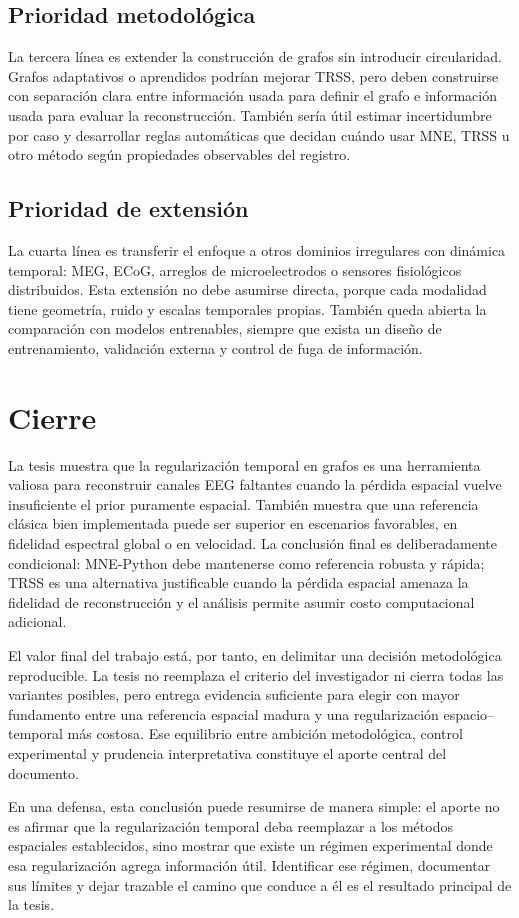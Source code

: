 \subsection*{Prioridad metodológica}

La tercera línea es extender la construcción de grafos sin introducir circularidad. Grafos adaptativos o aprendidos podrían mejorar TRSS, pero deben construirse con separación clara entre información usada para definir el grafo e información usada para evaluar la reconstrucción. También sería útil estimar incertidumbre por caso y desarrollar reglas automáticas que decidan cuándo usar MNE, TRSS u otro método según propiedades observables del registro.

\subsection*{Prioridad de extensión}

La cuarta línea es transferir el enfoque a otros dominios irregulares con dinámica temporal: MEG, ECoG, arreglos de microelectrodos o sensores fisiológicos distribuidos. Esta extensión no debe asumirse directa, porque cada modalidad tiene geometría, ruido y escalas temporales propias. También queda abierta la comparación con modelos entrenables, siempre que exista un diseño de entrenamiento, validación externa y control de fuga de información.

\section{Cierre}

La tesis muestra que la regularización temporal en grafos es una herramienta valiosa para reconstruir canales EEG faltantes cuando la pérdida espacial vuelve insuficiente el prior puramente espacial. También muestra que una referencia clásica bien implementada puede ser superior en escenarios favorables, en fidelidad espectral global o en velocidad. La conclusión final es deliberadamente condicional: MNE-Python debe mantenerse como referencia robusta y rápida; TRSS es una alternativa justificable cuando la pérdida espacial amenaza la fidelidad de reconstrucción y el análisis permite asumir costo computacional adicional.

El valor final del trabajo está, por tanto, en delimitar una decisión metodológica reproducible. La tesis no reemplaza el criterio del investigador ni cierra todas las variantes posibles, pero entrega evidencia suficiente para elegir con mayor fundamento entre una referencia espacial madura y una regularización espacio--temporal más costosa. Ese equilibrio entre ambición metodológica, control experimental y prudencia interpretativa constituye el aporte central del documento.

En una defensa, esta conclusión puede resumirse de manera simple: el aporte no es afirmar que la regularización temporal deba reemplazar a los métodos espaciales establecidos, sino mostrar que existe un régimen experimental donde esa regularización agrega información útil. Identificar ese régimen, documentar sus límites y dejar trazable el camino que conduce a él es el resultado principal de la tesis.
